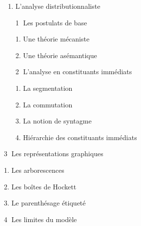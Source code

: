 \begin{keybox}
\begin{enumerate}[label=\arabic*.]
\item L’analyse distributionnaliste\par
\textcircled{\scriptsize 1} Les postulats de base\par\hspace*{1em}1. Une théorie mécaniste\par\hspace*{1em}2. Une théorie asémantique\par
\textcircled{\scriptsize 2} L’analyse en constituants immédiats\par\hspace*{1em}1. La segmentation\par\hspace*{1em}2. La commutation\par\hspace*{1em}3. La notion de syntagme\par\hspace*{1em}4. Hiérarchie des constituants immédiats
\end{enumerate}
\textcircled{\scriptsize 3} Les représentations graphiques\par\hspace*{1em}1. Les arborescences\par\hspace*{1em}2. Les boîtes de Hockett\par\hspace*{1em}3. Le parenthésage étiqueté\par
\textcircled{\scriptsize 4} Les limites du modèle


\end{keybox}
